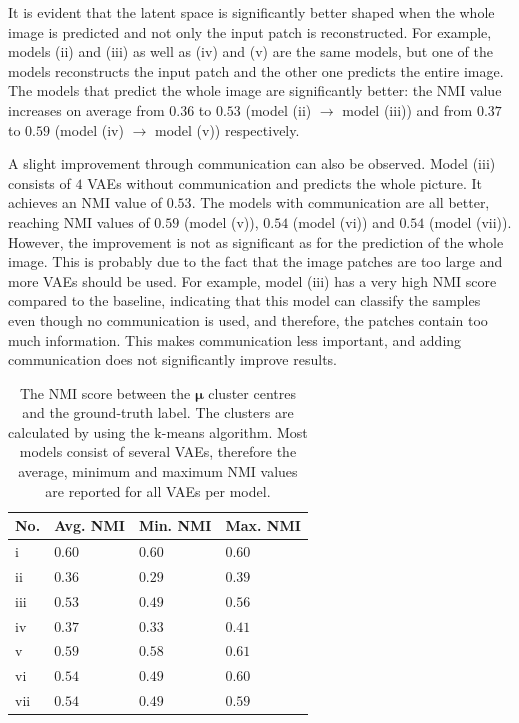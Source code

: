 It is evident that the latent space is significantly better shaped when the whole image is predicted and not only the input patch is reconstructed. For example, models (ii) and (iii) as well as (iv) and (v) are the same models, but one of the models reconstructs the input patch and the other one predicts the entire image. The models that predict the whole image are significantly better: the NMI value increases on average from $0.36$ to $0.53$ (model (ii) $\rightarrow$ model (iii)) and from $0.37$ to $0.59$ (model (iv) $\rightarrow$ model (v)) respectively.

A slight improvement through communication can also be observed. Model (iii) consists of $4$ VAEs without communication and predicts the whole picture. It achieves an NMI value of $0.53$. The models with communication are all better, reaching NMI values of $0.59$ (model (v)), $0.54$ (model (vi)) and $0.54$ (model (vii)). However, the improvement is not as significant as for the prediction of the whole image. This is probably due to the fact that the image patches are too large and more VAEs should be used. For example, model (iii) has a very high NMI score compared to the baseline, indicating that this model can classify the samples even though no communication is used, and therefore, the patches contain too much information. This makes communication less important, and adding communication does not significantly improve results.


\begin{table}[h] 
    \centering
	 \begin{tabular}{l l l l}
    	\textbf{No.} & \textbf{Avg. NMI} & \textbf{Min. NMI} & \textbf{Max. NMI}\\
        \hline
		i & $0.60$ & $0.60$ & $0.60$ \\
		ii & $0.36$  & $0.29$ & $0.39$ \\
		iii & $0.53$ & $0.49$ & $0.56$ \\
		iv & $0.37$ & $0.33$ & $0.41$\\
		v & $0.59$ & $0.58$ & $0.61$ \\
		vi & $0.54$ & $0.49$ & $0.60$ \\
		vii & $0.54$ & $0.49$ & $0.59$\\
    \end{tabular}
    \caption[NMI score of different architectures]{The NMI score between the $\boldsymbol{\mu}$ cluster centres and the ground-truth label. The clusters are calculated by using the k-means algorithm. Most models consist of several VAEs, therefore the average, minimum and maximum NMI values are reported for all VAEs per model.}
\end{table}

